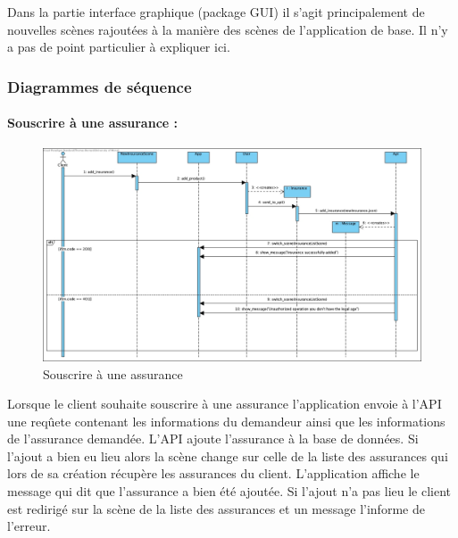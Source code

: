 \documentclass[../rapport.tex]{subfiles}
\begin{document}
		\bigskip

		Dans la partie interface graphique (package GUI) il s'agit principalement de nouvelles 
		scènes rajoutées à la manière des scènes de l'application de base. Il n'y a pas de 
		point particulier à expliquer ici.
		
		\subsubsection{Diagrammes de séquence}
				\paragraph{Souscrire à une assurance :}
						\begin{figure}[h!]
								\centering\includegraphics[scale=0.3]{ressources/photos_diagrammes/extensionThomas/souscrireAssurance.jpg}
								\caption{Souscrire à une assurance}
						\end{figure}
					Lorsque le client souhaite souscrire à une assurance l'application envoie à l'API une reqûete contenant les informations du demandeur ainsi que les informations de l'assurance
					demandée. L'API ajoute l'assurance à la base de données. Si l'ajout a bien eu lieu alors la scène change sur celle de la liste des assurances qui lors de sa création récupère
					les assurances du client. L'application affiche le message qui dit que l'assurance a bien été ajoutée.
					\medskip
					Si l'ajout n'a pas lieu le client est redirigé sur la scène de la liste des assurances et un message l'informe de l'erreur.
\newpage
\end{document}
